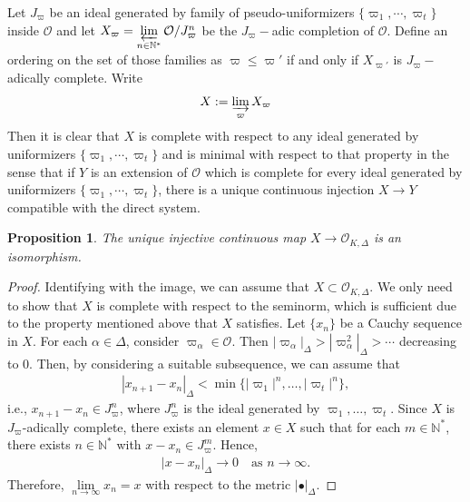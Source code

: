 \documentclass[12pts,a4paper]{amsart}
\newtheorem{proposition}{Proposition}[section]
\begin{document}
Let $J_\varpi$ be an ideal generated by family of pseudo-uniformizers $\{\varpi_1,\cdots,\varpi_t\}$ inside $\mathcal{O}$ and let $X_\varpi=\varprojlim\limits_{n\in\mathbb{N}^*}\mathcal{O}/J^n_\varpi$ be the $J_\varpi-$adic completion of $\mathcal{O}$. Define an ordering on the set of those families as $\varpi\leq \varpi'$ if and only if $X_{\varpi'}$ is $J_{\varpi}-$adically complete. Write 
\begin{align*}
	X:=\varinjlim\limits_\varpi X_\varpi
\end{align*}
Then it is clear that $X$ is complete with respect to any ideal generated by uniformizers $\{\varpi_1,\cdots,\varpi_t\}$ and is minimal with respect to that property in the sense that if $Y$ is an extension of $\mathcal{O}$ which is complete for every ideal generated by uniformizers $\{\varpi_1,\cdots,\varpi_t\}$, there is a unique continuous injection $X\to Y$ compatible with the direct system. 

\begin{proposition}
	The unique injective continuous map $X\to \mathcal{O}_{K,\Delta}$ is an isomorphism. 
\end{proposition}

\begin{proof}
Identifying with the image, we can assume that $X\subset\mathcal{O}_{K,\Delta}$. We only need to show that $X$ is complete with respect to the seminorm, which is sufficient due to the property mentioned above that $X$ satisfies. Let $\{x_n\}$ be a Cauchy sequence in $X$. For each $\alpha\in \Delta$, consider $\varpi_\alpha\in\mathcal{O}$. Then $|\varpi_\alpha|_\Delta>|\varpi^2_{\alpha}|_\Delta>\cdots$ decreasing to 0. Then, by considering a suitable subsequence, we can assume that
\begin{align*}
|x_{n+1} - x_n|_\Delta < \min\{|\varpi_1|^n, \ldots, |\varpi_t|^n\},
\end{align*}
i.e., \( x_{n+1} - x_n \in J^n_\varpi \), where \( J^n_\varpi \) is the ideal generated by \( \varpi_1, \ldots, \varpi_t \). Since \( X \) is \( J_\varpi \)-adically complete, there exists an element \( x \in X \) such that for each \( m \in \mathbb{N}^* \), there exists \( n \in \mathbb{N}^* \) with \( x - x_n \in J^m_\varpi \). Hence,
\begin{align*}
|x - x_n|_\Delta \to 0 \quad \text{as } n \to \infty.
\end{align*}
Therefore, $\lim\limits_{n\to\infty}x_n=x$ with respect to the metric $|\bullet|_\Delta$.
\end{proof}
\end{document}
